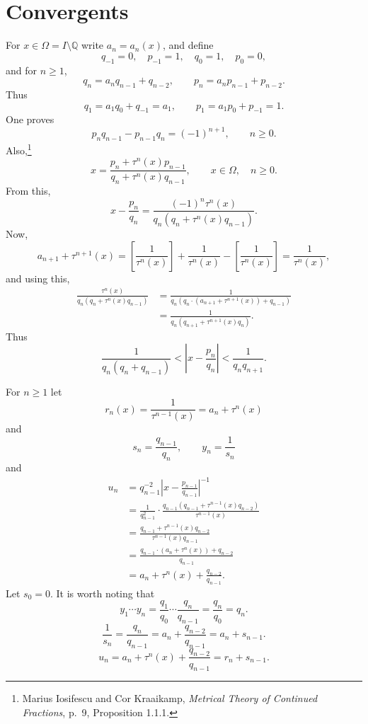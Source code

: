 \documentclass{article}
\theoremstyle{definition}
\theoremstyle{definition}
\begin{document}
\section{Convergents}
For $x \in \Omega = I \setminus \mathbb{Q}$ write $a_n=a_n(x)$, and define
\[
q_{-1}=0,\quad p_{-1}=1,\quad q_0=1,\quad p_0=0,
\]
and for $n \geq 1$,
\[
q_n=a_n q_{n-1}+q_{n-2},\qquad p_n=a_np_{n-1}+p_{n-2}.
\]
Thus
\[
q_1 = a_1 q_0+q_{-1} = a_1,\qquad p_1 = a_1 p_0+p_{-1} = 1.
\]
One proves
\[
p_nq_{n-1}-p_{n-1}q_n=(-1)^{n+1},\qquad n \geq 0.
\]
Also,\footnote{Marius Iosifescu and Cor Kraaikamp,
{\em Metrical Theory of Continued Fractions}, p.~9, Proposition 1.1.1.}
\[
x = \frac{p_n+\tau^n(x) p_{n-1}}{q_n+\tau^n(x) q_{n-1}},\qquad x \in \Omega,\quad n \geq 0.
\]
From this,
\[
x - \frac{p_n}{q_n} = \frac{(-1)^n \tau^n(x)}{q_n(q_n+\tau^n(x) q_{n-1})}.
\]
Now,
\[
a_{n+1} + \tau^{n+1}(x) = \left[\frac{1}{\tau^n(x)} \right] + \frac{1}{\tau^n(x)} - \left[\frac{1}{\tau^n(x)} \right]
=\frac{1}{\tau^n(x)},
\]
and using this,
\begin{align*}
 \frac{\tau^n(x)}{q_n(q_n+\tau^n(x) q_{n-1})}&= \frac{1}{q_n(q_n \cdot (a_{n+1} + \tau^{n+1}(x))+q_{n-1})}\\
 &=\frac{1}{q_n(q_{n+1}+\tau^{n+1}(x) q_n)}.
\end{align*}
Thus
\[
\frac{1}{q_n(q_n+q_{n-1})} < \left| x - \frac{p_n}{q_n} \right| < \frac{1}{q_n q_{n+1}}.
\]

For $n \geq 1$ let 
\[
r_n(x) = \frac{1}{\tau^{n-1}(x)}=a_n+\tau^n(x)
\]
and
\[
s_n = \frac{q_{n-1}}{q_n},\qquad y_n=\frac{1}{s_n}
\]
and
\begin{align*}
u_n &= q_{n-1}^{-2} \left|x-\frac{p_{n-1}}{q_{n-1}}\right|^{-1}\\
&=\frac{1}{q_{n-1}^2} \cdot \frac{q_{n-1}(q_{n-1}+\tau^{n-1}(x) q_{n-2})}{\tau^{n-1}(x)}\\
&=\frac{q_{n-1}+\tau^{n-1}(x)q_{n-2}}{\tau^{n-1}(x) q_{n-1}}\\
&=\frac{q_{n-1} \cdot (a_n+\tau^n(x)) + q_{n-2}}{q_{n-1}}\\
&=a_n+\tau^n(x) + \frac{q_{n-2}}{q_{n-1}}.
\end{align*}
Let $s_0=0$.
It is worth noting that
\[
y_1 \cdots y_n = \frac{q_1}{q_0} \cdots \frac{q_n}{q_{n-1}} = \frac{q_n}{q_0} = q_n.
\]
\[
\frac{1}{s_n} = \frac{q_n}{q_{n-1}} = a_n + \frac{q_{n-2}}{q_{n-1}} = a_n + s_{n-1}.
\]
\[
u_n = a_n+\tau^n(x) + \frac{q_{n-2}}{q_{n-1}} = r_n + s_{n-1}.
\]
\end{document}
